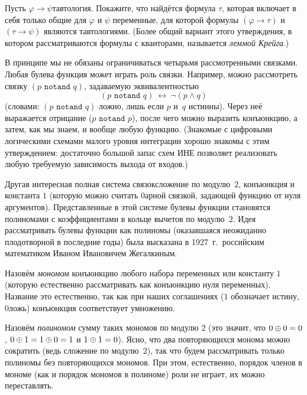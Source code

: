 \begin{problem}
Пусть $\varphi\to\psi$\т тавтология. Покажите, что найдётся
формула $\tau$, которая включает в себя только общие для
$\varphi$ и $\psi$ переменные, для которой формулы
$(\varphi\to\tau)$ и $(\tau\to\psi)$ являются тавтологиями.
(Более общий вариант этого утверждения, в котором
рассматриваются формулы с кванторами, называется \emph{леммой
Крейга}.)%
%
\end{problem}

В принципе мы не обязаны ограничиваться четырьмя рассмотренными
связками. Любая булева функция может играть роль связки.
Например, можно рассмотреть связку
$(p \texttt{ notand } q)$,%
задаваемую эквивалентностью
        $$
(p \texttt{ notand } q) \ \leftrightarrow \ \lnot(p\land q)
        $$
(словами: $(p\texttt{ notand }q)$ ложно, лишь если $p$ и~$q$
истинны). Через неё выражается отрицание ($p \texttt{ notand }p$),
после чего можно выразить конъюнкцию, а затем, как мы знаем, и
вообще любую функцию. (Знакомые с цифровыми
логическими схемами малого уровня интеграции хорошо знакомы с этим
утверждением: достаточно большой запас схем И\д НЕ позволяет реализовать
любую требуемую зависимость выхода от входов.)

Другая интересная полная система связок\т сложение по
модулю~$2$, конъюнкция и константа $1$ (которую можно считать
$0$\д арной связкой, задающей функцию от нуля аргументов).
Представленные в этой системе булевы функции становятся
полиномами с коэффициентами в кольце вычетов по модулю~$2$. Идея
рассматривать булевы функции как полиномы (оказавшаяся
неожиданно плодотворной в последние годы) была высказана в
1927~г.\ российским математиком Иваном Ивановичем
Жегалкиным.

Назовём \emph{мономом}%
конъюнкцию любого набора переменных или
константу $1$ (которую естественно рассматривать как конъюнкцию
нуля переменных). Название это естественно, так как при наших
соглашениях ($1$ обозначает истину, $0$\т ложь) конъюнкция соответствует
умножению.

Назовём \emph{полиномом}%
сумму таких мономов по модулю $2$ (это
значит, что $0\oplus0\hm =0$, $0\oplus 1\hm=1\oplus 0\hm=1$ и
$1\oplus1\hm=0$). Ясно, что два повторяющихся монома можно
сократить (ведь сложение по модулю~$2$), так что будем
рассматривать только полиномы без повторяющихся мономов.
При этом, естественно, порядок членов в мономе (как и порядок
мономов в полиноме) роли не играет, их можно переставлять.


